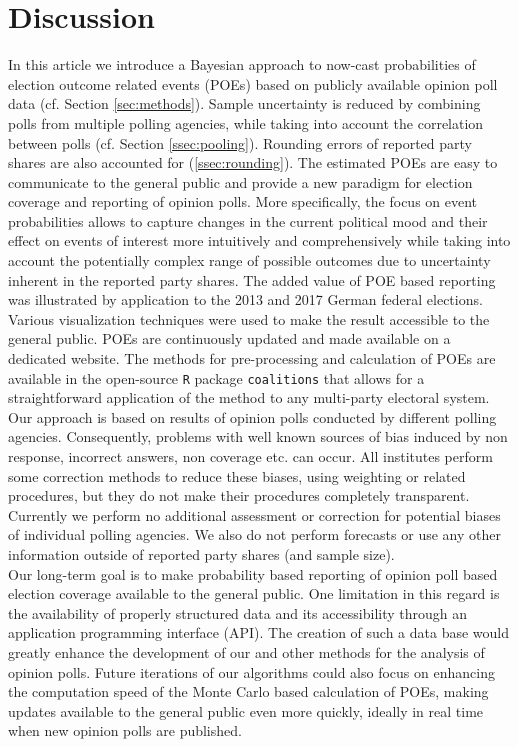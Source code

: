 \documentclass[smallcondensed]{svjour3}     %
\begin{document}
\section{Discussion} \label{sec:conclusion}
In this article we introduce a Bayesian approach to now-cast probabilities of
election outcome related events (POEs) based on publicly available opinion poll data
(cf. Section \ref{sec:methods}).
Sample uncertainty is reduced by combining polls from multiple polling agencies,
while taking into account the correlation between polls
(cf. Section \ref{ssec:pooling}). Rounding errors of
reported party shares are also accounted for (\ref{ssec:rounding}).
The estimated POEs are easy to communicate to the general public and provide
a new paradigm for election coverage and reporting of opinion polls.
More specifically, the focus on event probabilities allows to capture
changes in the current political mood and their effect on events of interest more
intuitively and comprehensively while taking into account the potentially complex
range of possible outcomes due to uncertainty inherent in the
reported party shares. The added value of POE based reporting was illustrated by
application to the 2013 and 2017 German federal elections.
Various visualization techniques were used to make the result accessible to the
general public. POEs are continuously updated and
made available on a dedicated website. The methods for pre-processing and
calculation of POEs are available in the
open-source \texttt{R} package \texttt{coalitions} that allows for a straightforward
application of the method to any multi-party electoral system.\\

Our approach is based on results of opinion polls conducted by different
polling agencies. Consequently, problems with well known sources of bias induced
by non response, incorrect answers, non coverage etc. can occur. All institutes
perform some correction methods to reduce these biases, using weighting or related
procedures, but they do not make their procedures completely transparent.
Currently we perform no additional assessment or correction for potential biases
of individual polling agencies. We also do not perform forecasts or use
any other information outside of reported party shares (and sample size).\\


Our long-term goal is to make probability based reporting of opinion poll based
election coverage available to the general public. One limitation in this regard
is the availability of properly structured data and its accessibility through
an application programming interface (API). The creation of such a data base
would greatly enhance the development of our and other methods for the analysis
of opinion polls. Future iterations of our algorithms could also focus on
enhancing  the computation speed of the Monte Carlo based calculation of
POEs, making updates available to the general public even more quickly,
ideally in real time when new opinion polls are published.
\end{document}
